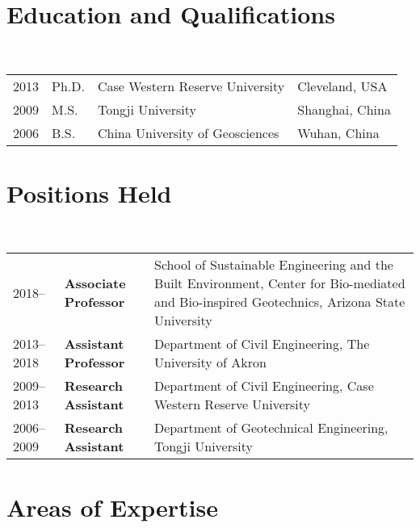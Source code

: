 \documentclass[letterpaper, 12pt]{extarticle}
\begin{document}
\maketitle

\section{Education and Qualifications}

~\begin{tabular}{llll}
2013 & Ph.D. & Case Western Reserve University & Cleveland, USA \\
2009 & M.S. & Tongji University & Shanghai, China\\
2006 & B.S. & China University of Geosciences & Wuhan, China
\end{tabular}


\section{Positions Held}

~\begin{tabular}{lP{3.5cm}P{11cm}}
2018--& \textbf{Associate Professor} &
        School of Sustainable Engineering and the Built Environment,
        \newline
        Center for Bio-mediated and Bio-inspired Geotechnics,
        \newline
        Arizona State University\\
2013--2018 & \textbf{Assistant Professor} &
        Department of Civil Engineering,
        \newline
        The University of Akron \\
2009--2013 & \textbf{Research Assistant} &
        Department of Civil Engineering,
        \newline
        Case Western Reserve University \\
2006--2009 & \textbf{Research Assistant} &
        Department of Geotechnical Engineering,
        \newline
        Tongji University
  \end{tabular}

\section{Areas of Expertise}%
\end{document}

